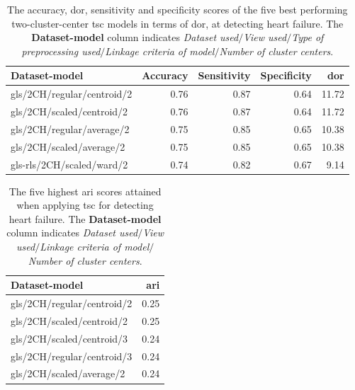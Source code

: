 \begin{table}
    \centering
    \begin{tabular}{lrrrr}
        \toprule
        Dataset-model             &  Accuracy &  Sensitivity &  Specificity & \acrshort{dor} \\
        \midrule
        \acrshort{gls}/2CH/regular/centroid/2 &      0.76 &         0.87 &         0.64 & 11.72 \\
        \acrshort{gls}/2CH/scaled/centroid/2  &      0.76 &         0.87 &         0.64 & 11.72 \\
        \acrshort{gls}/2CH/regular/average/2  &      0.75 &         0.85 &         0.65 & 10.38 \\
        \acrshort{gls}/2CH/scaled/average/2   &      0.75 &         0.85 &         0.65 & 10.38 \\
        \acrshort{gls}-rls/2CH/scaled/ward/2  &      0.74 &         0.82 &         0.67 &  9.14 \\
        \bottomrule
    \end{tabular}
    \caption{The accuracy, \acrshort{dor}, sensitivity and specificity scores of the five best performing two-cluster-center \acrshort{tsc} models in terms of \acrshort{dor}, at detecting heart failure.
             The \textbf{Dataset-model} column indicates \textit{Dataset used}$/$\textit{View used}$/$\textit{Type of preprocessing used}$/$\textit{Linkage criteria of model}$/$\textit{Number of cluster centers}.}
    \label{tab:tsc_hf_dor_sens_spec_dist}
\end{table}

\begin{table}[htb]
    \centering
    \begin{tabular}{lr}
        \toprule
        Dataset-model             &  \acrshort{ari} \\
        \midrule
        \acrshort{gls}/2CH/regular/centroid/2 & 0.25 \\
        \acrshort{gls}/2CH/scaled/centroid/2  & 0.25 \\
        \acrshort{gls}/2CH/scaled/centroid/3  & 0.24 \\
        \acrshort{gls}/2CH/regular/centroid/3 & 0.24 \\
        \acrshort{gls}/2CH/scaled/average/2   & 0.24 \\
        \bottomrule
    \end{tabular}
    \caption{The five highest \acrshort{ari} scores attained when applying \acrshort{tsc} for detecting heart failure. The \textbf{Dataset-model} column indicates \textit{Dataset used}$/$\textit{View used}$/$\textit{Linkage criteria of model}$/$\textit{Number of cluster centers}.}
    \label{tab:tsc_hf_ari}
\end{table}

